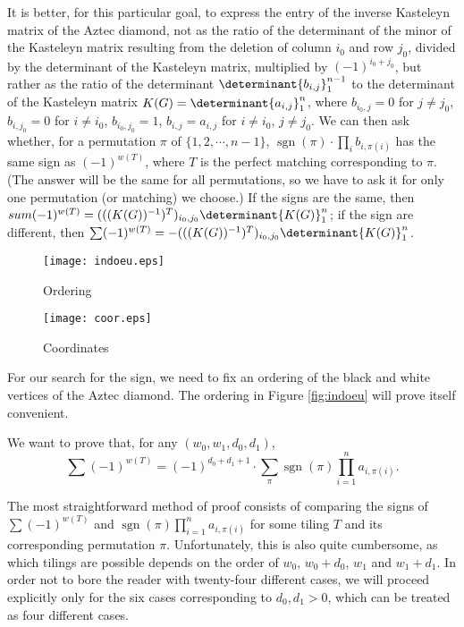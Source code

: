 \documentclass[10pt,reqno]{amsart}
\theoremstyle{plain}
\theoremstyle{definition}
\theoremstyle{remark}
\DeclareMathOperator{\sgn }{sgn }
\begin{document}
It is better, for this particular goal, to
express the entry of the inverse Kasteleyn matrix of the Aztec diamond, 
not as the ratio of the determinant of the minor of the Kasteleyn matrix
resulting from the deletion of 
column $i_0$ and row $j_0$, divided by the determinant of the Kasteleyn
matrix, multiplied by $(-1)^{i_0+j_0}$, but rather as the ratio
of the determinant $\determinant{b_{i,j}}_1^{n-1}$ to the determinant of the
Kasteleyn matrix $K(G) = \determinant{a_{i,j}}_1^n$, where $b_{i_0,j}=0$
for $j\ne j_0$, $b_{i,j_0}=0$ for $i\ne i_0$, $b_{i_0,j_0}=1$,
$b_{i,j}=a_{i,j}$ for $i\ne i_0$, $j\ne j_0$. We can then ask whether,
for a permutation $\pi $ of $\{1,2,\dotsb ,n-1\}$, 
$\sgn(\pi ) \cdot \prod_{i} b_{i,\pi(i)}$
has the same sign as $(-1)^{w(T)}$, where $T$ is the perfect matching 
corresponding to $\pi$. (The answer will be the same for all permutations, 
so we have to ask it for only one permutation (or matching) we choose.)
If the signs are the same, then
$sum (-1)^{w(T)} = 
(((K(G))^{-1})^T)_{i_0,j_0} \determinant{K(G)}_1^n$; if
the sign are different, then
$\sum (-1)^{w(T)} = 
- (((K(G))^{-1})^T)_{i_0,j_0} \determinant{K(G)}_1^n$.

\begin{figure}
        \begin{minipage}[b]{0.5\linewidth}
                \centering \texttt{[image: indoeu.eps]}
                \caption{Ordering}\label{fig:indoeu}
        \end{minipage}%
        \begin{minipage}[b]{0.5\linewidth}
                \texttt{[image: coor.eps]}
                \caption{Coordinates} \label{fig:coor}   
        \end{minipage}%
\end{figure}

For our search for the sign, we need to fix an ordering of the black and
white vertices of the Aztec diamond. The ordering in Figure
\ref{fig:indoeu} will prove itself convenient.

We want to prove that, for any $(w_0,w_1,d_0,d_1)$, 
\[
\sum (-1)^{w(T)} = (-1)^{d_0+d_1+1}\cdot 
\sum_{\pi } \sgn(\pi ) \prod_{i=1}^n a_{i,\pi(i)}. \label{eq:mandrake}
\]

The most straightforward method of proof consists of comparing the signs
of $\sum (-1)^{w(T)}$ and $\sgn(\pi ) \prod_{i=1}^n a_{i,\pi(i)}$ for
some tiling $T$ and its corresponding permutation $\pi $. Unfortunately,
this is also quite cumbersome, as which tilings are possible depends
on the order of $w_0$, $w_0+d_0$, $w_1$ and $w_1+d_1$. In order not to
bore the reader with twenty-four different cases, we will proceed
explicitly only for the six cases corresponding to $d_0,d_1>0$, which
can be treated as four different cases.
\end{document}
